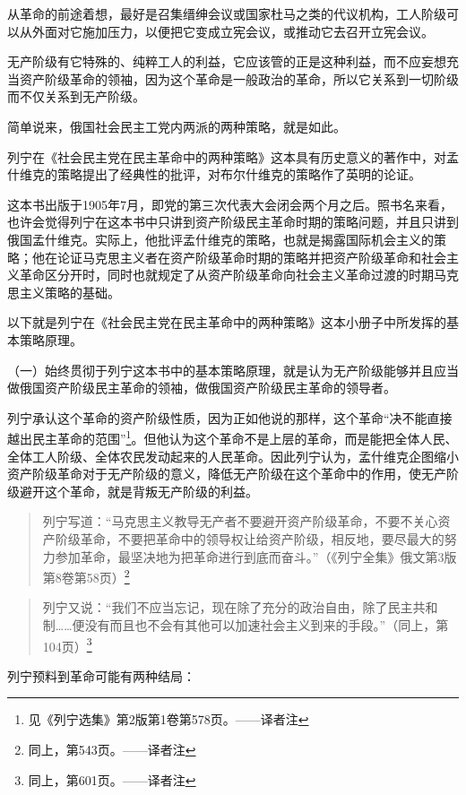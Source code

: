 从革命的前途着想，最好是召集缙绅会议或国家杜马之类的代议机构，工人阶级可以从外面对它施加压力，以便把它变成立宪会议，或推动它去召开立宪会议。

无产阶级有它特殊的、纯粹工人的利益，它应该管的正是这种利益，而不应妄想充当资产阶级革命的领袖，因为这个革命是一般政治的革命，所以它关系到一切阶级而不仅关系到无产阶级。

简单说来，俄国社会民主工党内两派的两种策略，就是如此。

列宁在《社会民主党在民主革命中的两种策略》这本具有历史意义的著作中，对孟什维克的策略提出了经典性的批评，对布尔什维克的策略作了英明的论证。

这本书出版于1905年7月，即党的第三次代表大会闭会两个月之后。照书名来看，也许会觉得列宁在这本书中只讲到资产阶级民主革命时期的策略问题，并且只讲到俄国孟什维克。实际上，他批评孟什维克的策略，也就是揭露国际机会主义的策略；他在论证马克思主义者在资产阶级革命时期的策略并把资产阶级革命和社会主义革命区分开时，同时也就规定了从资产阶级革命向社会主义革命过渡的时期马克思主义策略的基础。

以下就是列宁在《社会民主党在民主革命中的两种策略》这本小册子中所发挥的基本策略原理。

（一）始终贯彻于列宁这本书中的基本策略原理，就是认为无产阶级能够并且应当做俄国资产阶级民主革命的领袖，做俄国资产阶级民主革命的领导者。

列宁承认这个革命的资产阶级性质，因为正如他说的那样，这个革命“决不能直接越出民主革命的范围”\footnote{见《列宁选集》第2版第1卷第578页。——译者注}。但他认为这个革命不是上层的革命，而是能把全体人民、全体工人阶级、全体农民发动起来的人民革命。因此列宁认为，孟什维克企图缩小资产阶级革命对于无产阶级的意义，降低无产阶级在这个革命中的作用，使无产阶级避开这个革命，就是背叛无产阶级的利益。

\begin{quotation}
列宁写道：“马克思主义教导无产者不要避开资产阶级革命，不要不关心资产阶级革命，不要把革命中的领导权让给资产阶级，相反地，要尽最大的努力参加革命，最坚决地为把革命进行到底而奋斗。”（《列宁全集》俄文第3版第8卷第58页）\footnote{同上，第543页。——译者注}
\end{quotation}

\begin{quotation}
列宁又说：“我们不应当忘记，现在除了充分的政治自由，除了民主共和制……便没有而且也不会有其他可以加速社会主义到来的手段。”（同上，第104页）\footnote{同上，第601页。——译者注}
\end{quotation}

列宁预料到革命可能有两种结局：

